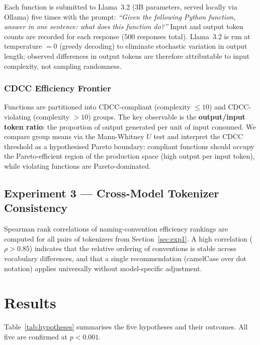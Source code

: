 \documentclass[11pt,a4paper]{article}
\begin{document}
Each function is submitted to Llama~3.2 (3B parameters, served locally via
Ollama) five times with the prompt: \emph{``Given the following Python
function, answer in one sentence: what does this function do?''} Input and
output token counts are recorded for each response ($500$ responses total).
Llama~3.2 is run at temperature $= 0$ (greedy decoding) to eliminate
stochastic variation in output length; observed differences in output tokens
are therefore attributable to input complexity, not sampling randomness.

\subsubsection{CDCC Efficiency Frontier}

Functions are partitioned into CDCC-compliant (complexity $\leq 10$) and
CDCC-violating (complexity $> 10$) groups. The key observable is the
\textbf{output/input token ratio}: the proportion of output generated per
unit of input consumed. We compare group means via the Mann-Whitney $U$
test and interpret the CDCC threshold as a hypothesised Pareto boundary:
compliant functions should occupy the Pareto-efficient region of the
production space (high output per input token), while violating functions
are Pareto-dominated.

\subsection{Experiment 3 --- Cross-Model Tokenizer Consistency}
\label{sec:exp3}

Spearman rank correlations of naming-convention efficiency rankings are
computed for all pairs of tokenizers from Section~\ref{sec:exp1}. A high
correlation ($\rho > 0.85$) indicates that the relative ordering of
conventions is stable across vocabulary differences, and that a single
recommendation (camelCase over dot notation) applies universally without
model-specific adjustment.

\section{Results}

Table~\ref{tab:hypotheses} summarises the five hypotheses and their outcomes.
All five are confirmed at $p < 0.001$.
\end{document}
